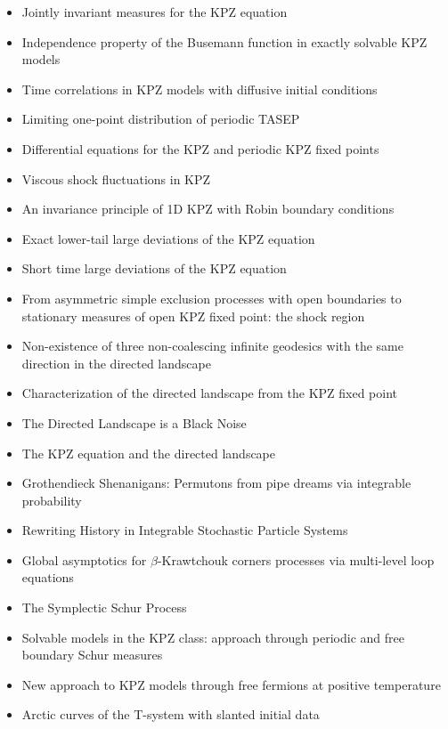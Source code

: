 \documentclass[10pt]{article}
\numberwithin{equation}{section}
\theoremstyle{plain}
\theoremstyle{plain}
\theoremstyle{definition}
\begin{document}
\begin{itemize}
	\item \cite{groathouse2023jointly} {Jointly invariant measures for the KPZ equation}
	\item \cite{Shen2023a} {Independence property of the Busemann function in exactly solvable KPZ models}
	\item \cite{Shen2023b} {Time correlations in KPZ models with diffusive initial conditions}
	\item \cite{Baik2022} {Limiting one-point distribution of periodic TASEP}
	\item \cite{Baik2023} {Differential equations for the KPZ and periodic KPZ fixed points}
	\item \cite{Dunlap2024} {Viscous shock fluctuations in KPZ}
	\item \cite{Tang2024} {An invariance principle of 1D KPZ with Robin boundary conditions}
	\item \cite{Tsai2022} {Exact lower-tail large deviations of the KPZ equation}
	\item \cite{Lin2021} {Short time large deviations of the KPZ equation}
	\item \cite{Wang2024} {From asymmetric simple exclusion processes with open boundaries to stationary measures of open KPZ fixed point: the shock region}
	\item \cite{busani2023nonexistence} {Non-existence of three non-coalescing infinite geodesics with the same direction in the directed landscape}
	\item \cite{dauvergne2024characterization} {Characterization of the directed landscape from the KPZ fixed point}
	\item \cite{himwich2024directed} {The Directed Landscape is a Black Noise}
	\item \cite{Wu2023} {The KPZ equation and the directed landscape}
	\item \cite{GrothendieckShenanigans2024} {Grothendieck Shenanigans: Permutons from pipe dreams via integrable probability}
	\item \cite{petrov2022rewriting} {Rewriting History in Integrable Stochastic Particle Systems}
	\item \cite{dimitrov2024global} {Global asymptotics for $\beta$-Krawtchouk corners processes via multi-level loop equations}
	\item \cite{cuenca2024symplectic} {The Symplectic Schur Process}
	\item \cite{Imamura2022} {Solvable models in the KPZ class: approach through periodic and free boundary Schur measures}
	\item \cite{Imamura2023} {New approach to KPZ models through free fermions at positive temperature}
	\item \cite{DiFrancesco2024b} {Arctic curves of the T-system with slanted initial data}
\end{itemize}






\end{document}
